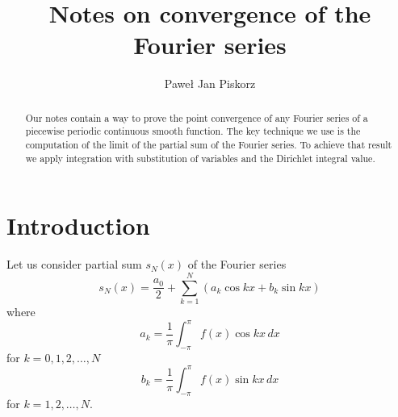 \documentclass[12pt]{amsart}
\theoremstyle{definition}
\numberwithin{equation}{section}
\begin{document}
\title[Notes on convergence of the Fourier series]{Notes on convergence of the Fourier series}






\author[P. J. Piskorz]{Pawe{\l} Jan Piskorz}



\date{}



\begin{abstract}
Our notes contain a way to prove the point convergence of any Fourier series of a piecewise periodic
continuous smooth function. 
The key technique we use is the computation of the limit of the partial sum of the Fourier series. 
To achieve that result we apply integration with substitution of variables and the Dirichlet integral value.
\end{abstract}







\maketitle


\section{Introduction}\label{sec1}



Let us consider partial sum $s_{N}(x)$ of the Fourier series
\begin{equation}
s_{N}(x)
=
\frac{a_{0}}{2} + \sum_{k=1}^{N} (a_{k} \cos kx + b_{k} \sin kx)
\end{equation}
where
\begin{equation}
a_{k} = \frac{1}{\pi} \int_{-\pi}^{\pi} f(x) \cos kx \, dx
\end{equation}
for $k = 0, 1, 2, \ldots, N$
\begin{equation}
b_{k} = \frac{1}{\pi} \int_{-\pi}^{\pi} f(x) \sin kx \, dx
\end{equation}
for $k = 1, 2, \ldots, N$\@.
\end{document}
